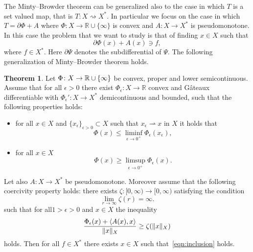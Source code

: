 \documentclass[a4paper,10pt,oneside]{amsbook}
\numberwithin{section}{chapter}
\numberwithin{equation}{chapter}
\theoremstyle{definition}
\newtheorem{thm}[prop]{Theorem}
\DeclarePairedDelimiter{\norm}{\lVert}{\rVert}
\DeclarePairedDelimiter{\dual}{\langle}{\rangle}
\begin{document}
The Minty--Browder theorem can be generalized also to the case in which $T$ is a set valued map, that is $T\colon X\rightsquigarrow X^*$. In particular we focus on the case in which $T=\partial\Phi+A$ where $\Phi\colon X\to\mathbb{R}\cup\{\infty\}$ is convex and $A\colon X\to X^*$ is pseudomonotone. In this case the problem that we want to study is that of finding $x\in X$ such that
\begin{equation}
\label{eqn:inclusion}
\partial\Phi(x)+A(x)\ni f,
\end{equation}
where $f\in X^*$. Here $\partial\Psi$ denotes the subdifferential of $\Psi$. The following generalization of Minty--Browder theorem holds.
\begin{thm}
\label{thm:inclusion}
Let $\Phi\colon X\to\mathbb{R}\cup\mathbb\{\infty\}$ be convex, proper and lower semicontinuous. Assume that for all $\epsilon>0$ there exist $\Phi_\epsilon\colon X\to\mathbb{R}$ convex and G\^ateaux differentiable with $\Phi_\epsilon'\colon X\to X^*$ demicontinuous and bounded, such that the following properties holds:
\begin{itemize}
\item[(i)] for all $x\in X$ and $\{x_\epsilon\}_{\epsilon>0}\subset X$ such that $x_\epsilon\rightharpoonup x$ in $X$ it holds that
\[
\Phi(x)\le\liminf_{\epsilon\to0^+}\Phi_\epsilon(x_\epsilon),
\]
\item[(ii)] for all $x\in X$
\[
\Phi(x)\ge\limsup_{\epsilon\to 0^+}\Phi_\epsilon(x).
\]
\end{itemize}
Let also $A\colon X\to X^*$ be pseudomonotone. Moreover assume that the following coercivity property holds: there exists $\zeta\colon[0,\infty)\to[0,\infty)$ satisfying the condition
\[
\lim_{r\to\infty}\zeta(r)=\infty.
\]
such that for all$1>\epsilon>0$ and $x\in X$ the inequality
\begin{equation}
\label{eqn:coercivity-property}
\dfrac{\Phi_\epsilon(x)+\dual{A(x),x}}{\norm{x}_X}\ge\zeta(\norm{x}_X)
\end{equation}
holds. Then for all $f\in X^*$ there exists $x\in X$ such that~\eqref{eqn:inclusion} holds.
\end{thm}
\end{document}
